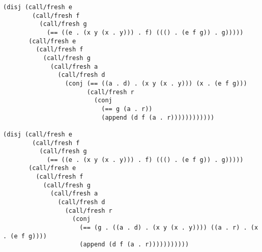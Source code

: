 \documentclass[11pt,twoside]{article}
\numberwithin{equation}{subsection} %
\begin{document}
\begin{Verbatim}
(disj (call/fresh e
        (call/fresh f
          (call/fresh g 
            (== ((e . (x y (x . y))) . f) ((() . (e f g)) . g)))))
       (call/fresh e
         (call/fresh f
           (call/fresh g 
             (call/fresh a
               (call/fresh d 
                 (conj (== ((a . d) . (x y (x . y))) (x . (e f g)))
                       (call/fresh r
                         (conj
                           (== g (a . r))
                           (append (d f (a . r))))))))))))

(disj (call/fresh e
        (call/fresh f
          (call/fresh g 
            (== ((e . (x y (x . y))) . f) ((() . (e f g)) . g)))))
       (call/fresh e
         (call/fresh f
           (call/fresh g 
             (call/fresh a
               (call/fresh d 
                 (call/fresh r
                   (conj 
                     (== (g . ((a . d) . (x y (x . y)))) ((a . r) . (x . (e f g))))
                     (append (d f (a . r)))))))))))
\end{Verbatim}  




\vspace{.5cm}



\end{document}
